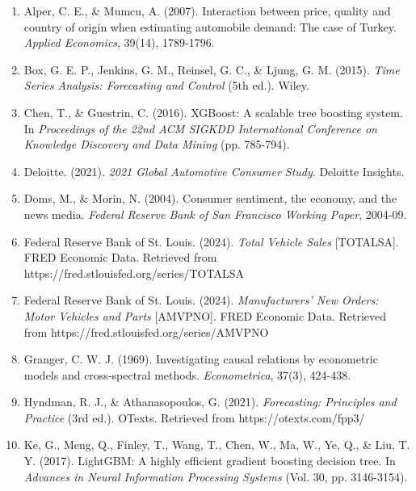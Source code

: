 \documentclass[12pt]{article}
\begin{document}
\begin{enumerate}
    \item Alper, C. E., \& Mumcu, A. (2007). Interaction between price, quality and country of origin when estimating automobile demand: The case of Turkey. \textit{Applied Economics}, 39(14), 1789-1796.
    
    \item Box, G. E. P., Jenkins, G. M., Reinsel, G. C., \& Ljung, G. M. (2015). \textit{Time Series Analysis: Forecasting and Control} (5th ed.). Wiley.
    
    \item Chen, T., \& Guestrin, C. (2016). XGBoost: A scalable tree boosting system. In \textit{Proceedings of the 22nd ACM SIGKDD International Conference on Knowledge Discovery and Data Mining} (pp. 785-794).
    
    \item Deloitte. (2021). \textit{2021 Global Automotive Consumer Study}. Deloitte Insights.
    
    \item Doms, M., \& Morin, N. (2004). Consumer sentiment, the economy, and the news media. \textit{Federal Reserve Bank of San Francisco Working Paper}, 2004-09.
    
    \item Federal Reserve Bank of St. Louis. (2024). \textit{Total Vehicle Sales} [TOTALSA]. FRED Economic Data. Retrieved from https://fred.stlouisfed.org/series/TOTALSA
    
    \item Federal Reserve Bank of St. Louis. (2024). \textit{Manufacturers' New Orders: Motor Vehicles and Parts} [AMVPNO]. FRED Economic Data. Retrieved from https://fred.stlouisfed.org/series/AMVPNO
    
    \item Granger, C. W. J. (1969). Investigating causal relations by econometric models and cross-spectral methods. \textit{Econometrica}, 37(3), 424-438.
    
    \item Hyndman, R. J., \& Athanasopoulos, G. (2021). \textit{Forecasting: Principles and Practice} (3rd ed.). OTexts. Retrieved from https://otexts.com/fpp3/
    
    \item Ke, G., Meng, Q., Finley, T., Wang, T., Chen, W., Ma, W., Ye, Q., \& Liu, T. Y. (2017). LightGBM: A highly efficient gradient boosting decision tree. In \textit{Advances in Neural Information Processing Systems} (Vol. 30, pp. 3146-3154).
    

\end{enumerate}
\end{document}
